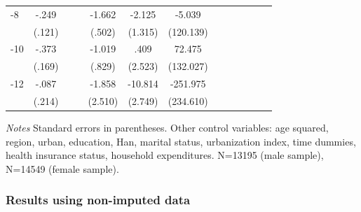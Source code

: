 \begin{table}[p]
\begin{adjustbox}{max width=\linewidth}
\begin{threeparttable}
{\begin{tabular}{l*{6}{S
S}}
-8             &    -.249\sym{**} &         &         &   -1.662\sym{***}&   -2.125         &   -5.039         \\
                &   (.121)         &         &         &   (.502)         &  (1.315)         &(120.139)         \\
-10            &    -.373\sym{**} &         &         &   -1.019         &     .409         &   72.475         \\
                &   (.169)         &         &         &   (.829)         &  (2.523)         &(132.027)         \\
-12           &    -.087         &         &         &   -1.858         &  -10.814\sym{***}& -251.975         \\
                &   (.214)         &         &         &  (2.510)         &  (2.749)         &(234.610)         \\
\bottomrule
\end{tabular}
\begin{tablenotes}
\item \textit{Notes}   Standard errors in parentheses.
Other control variables: age squared, region, urban, education, Han, marital status, urbanization index, time dummies, health insurance status, household expenditures. N=13195 (male sample), N=14549 (female sample).
\end{tablenotes}
}
\end{threeparttable}
\end{adjustbox}
\end{table}

\FloatBarrier
\clearpage
\subsubsection*{Results using non-imputed data}


